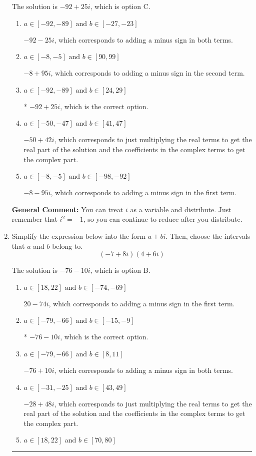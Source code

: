 \documentclass{extbook}[14pt]
\newcommand{\litem}[1]{\item #1

\rule{\textwidth}{0.4pt}}
\begin{document}
\begin{enumerate}
{The solution is \( -92 + 25 i \), which is option C.\begin{enumerate}[label=\Alph*.]
\item \( a \in [-92, -89] \text{ and } b \in [-27, -23] \)

 $-92 - 25 i$, which corresponds to adding a minus sign in both terms.
\item \( a \in [-8, -5] \text{ and } b \in [90, 99] \)

 $-8 + 95 i$, which corresponds to adding a minus sign in the second term.
\item \( a \in [-92, -89] \text{ and } b \in [24, 29] \)

* $-92 + 25 i$, which is the correct option.
\item \( a \in [-50, -47] \text{ and } b \in [41, 47] \)

 $-50 + 42 i$, which corresponds to just multiplying the real terms to get the real part of the solution and the coefficients in the complex terms to get the complex part.
\item \( a \in [-8, -5] \text{ and } b \in [-98, -92] \)

 $-8 - 95 i$, which corresponds to adding a minus sign in the first term.
\end{enumerate}

\textbf{General Comment:} You can treat $i$ as a variable and distribute. Just remember that $i^2=-1$, so you can continue to reduce after you distribute.
}
\litem{
Simplify the expression below into the form $a+bi$. Then, choose the intervals that $a$ and $b$ belong to.
\[ (-7 + 8 i)(4 + 6 i) \]

The solution is \( -76 - 10 i \), which is option B.\begin{enumerate}[label=\Alph*.]
\item \( a \in [18, 22] \text{ and } b \in [-74, -69] \)

 $20 - 74 i$, which corresponds to adding a minus sign in the first term.
\item \( a \in [-79, -66] \text{ and } b \in [-15, -9] \)

* $-76 - 10 i$, which is the correct option.
\item \( a \in [-79, -66] \text{ and } b \in [8, 11] \)

 $-76 + 10 i$, which corresponds to adding a minus sign in both terms.
\item \( a \in [-31, -25] \text{ and } b \in [43, 49] \)

 $-28 + 48 i$, which corresponds to just multiplying the real terms to get the real part of the solution and the coefficients in the complex terms to get the complex part.
\item \( a \in [18, 22] \text{ and } b \in [70, 80] \)


\end{enumerate}}
\end{enumerate}
\end{document}
